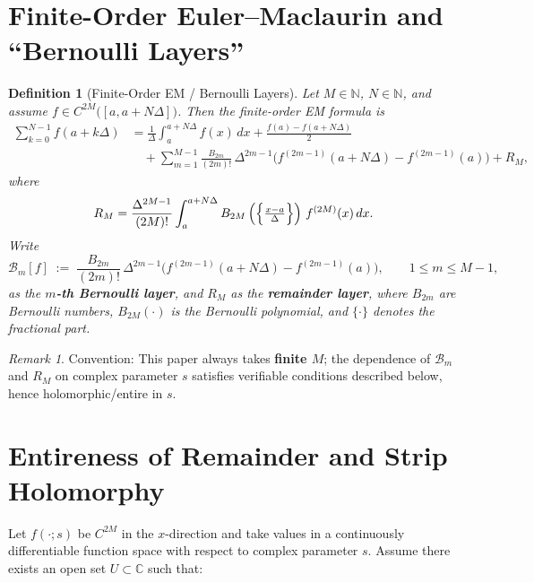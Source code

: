 \documentclass[11pt,a4paper]{article}
\newtheorem{definition}[theorem]{Definition}
\theoremstyle{remark}
\newtheorem{remark}[theorem]{Remark}
\begin{document}
\section{Finite-Order Euler--Maclaurin and ``Bernoulli Layers''}

\begin{definition}[Finite-Order EM / Bernoulli Layers]\label{def:EM}
Let $M\in\mathbb{N}$, $N\in\mathbb{N}$, and assume $f\in C^{2M}\bigl([a,a+N\Delta]\bigr)$. Then the finite-order EM formula is
\begin{equation}
\begin{aligned}
\sum_{k=0}^{N-1} f(a+k\Delta)
&= \frac{1}{\Delta}\int_{a}^{a+N\Delta} f(x)\,dx
+ \frac{f(a)-f(a+N\Delta)}{2}\\
&\quad+ \sum_{m=1}^{M-1}\frac{B_{2m}}{(2m)!}\,\Delta^{2m-1}\bigl(f^{(2m-1)}(a+N\Delta)-f^{(2m-1)}(a)\bigr)
+ R_M,
\end{aligned}
\end{equation}
where
\begin{equation}
R_M=\frac{\Delta^{2M-1}}{(2M)!}\int_{a}^{a+N\Delta} B_{2M}\left(\Bigl\{\tfrac{x-a}{\Delta}\Bigr\}\right)\, f^{(2M)}(x)\,dx.
\end{equation}
Write
\begin{equation}
\mathcal{B}_m[f]\;:=\;\frac{B_{2m}}{(2m)!}\,\Delta^{2m-1}\bigl(f^{(2m-1)}(a+N\Delta)-f^{(2m-1)}(a)\bigr),\qquad 1\le m\le M-1,
\end{equation}
as the \textbf{$m$-th Bernoulli layer}, and $R_M$ as the \textbf{remainder layer}, where $B_{2m}$ are Bernoulli numbers, $B_{2M}(\cdot)$ is the Bernoulli polynomial, and $\{\cdot\}$ denotes the fractional part.
\end{definition}

\begin{remark}
Convention: This paper always takes \textbf{finite $M$}; the dependence of $\mathcal{B}_m$ and $R_M$ on complex parameter $s$ satisfies verifiable conditions described below, hence holomorphic/entire in $s$.
\end{remark}

\section{Entireness of Remainder and Strip Holomorphy}

Let $f(\cdot;s)$ be $C^{2M}$ in the $x$-direction and take values in a continuously differentiable function space with respect to complex parameter $s$. Assume there exists an open set $U\subset\mathbb{C}$ such that:
\end{document}
